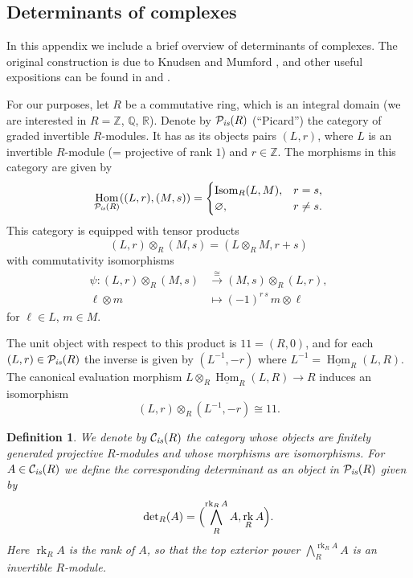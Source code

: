 \documentclass[10pt,a4paper,oneside,draft]{article}
\DeclareMathOperator{\Hom}{Hom}
\DeclareMathOperator{\Isom}{Isom}
\DeclareMathOperator{\rk}{rk}
\newcommand{\QQ}{\mathbb{Q}}
\newcommand{\RR}{\mathbb{R}}
\newcommand{\ZZ}{\mathbb{Z}}
\newcommand{\bone}{1\!\!1}
\renewcommand{\det}{\operatorname{det}}
\renewcommand{\emptyset}{\varnothing}
\newcommand{\is}{\text{\it is}}
\newcommand{\iHom}{\underline{\Hom}}
\theoremstyle{myplain}
\theoremstyle{mydefinition}
\newtheorem{definition}[theorem]{Definition}
\numberwithin{equation}{section}
\begin{document}
\begin{appendices}
\section{Determinants of complexes}
\label{app:determinants}

In this appendix we include a brief overview of determinants of complexes.
The original construction is due to Knudsen and Mumford
\cite{Knudsen-Mumford-1976}, and other useful expositions can be found in
\cite[Appendix~A]{Gelfand-Kapranov-Zelevinsky-1994} and
\cite[\S 2.1]{Kato-1993}.

For our purposes, let $R$ be a commutative ring, which is an integral domain
(we are interested in $R = \ZZ$, $\QQ$, $\RR$). Denote by
$\mathcal{P}_\is (R)$ (``Picard'') the category of graded invertible
$R$-modules. It has as its objects pairs $(L,r)$, where $L$ is an invertible
$R$-module (= projective of rank $1$) and $r \in \ZZ$. The morphisms in this
category are given by
\[ \Hom_{\mathcal{P}_\is (R)} ((L,r), (M,s)) = \begin{cases}
    \Isom_R (L,M), & r = s, \\
    \emptyset, & r \ne s.
  \end{cases} \]
This category is equipped with tensor products
$$(L,r) \otimes_R (M,s) = (L\otimes_R M, r + s)$$
with commutativity isomorphisms
\begin{align*}
  \psi\colon (L,r) \otimes_R (M,s) & \xrightarrow{\cong}
                                     (M,s) \otimes_R (L,r), \\
  \ell \otimes m & \mapsto (-1)^{r\,s}\,m\otimes \ell
\end{align*}
for $\ell \in L$, $m \in M$.

The unit object with respect to this product is $\bone = (R,0)$, and for each
$(L,r) \in \mathcal{P}_\is (R)$ the inverse is given by $(L^{-1}, -r)$ where
$L^{-1} = \iHom_R (L,R)$. The canonical evaluation morphism
$L \otimes_R \iHom_R (L,R) \to R$ induces an isomorphism
$$(L,r) \otimes_R (L^{-1}, -r) \cong \bone.$$

\begin{definition}
  \label{dfn:determinant-of-projective-fg-module}
  We denote by $\mathcal{C}_\is (R)$ the category whose objects are finitely
  generated projective $R$-modules and whose morphisms are isomorphisms.  For
  $A \in \mathcal{C}_\is (R)$ we define the corresponding determinant as an
  object in $\mathcal{P}_\is (R)$ given by
  $$\det_R (A) = \Bigl(\bigwedge^{\rk_R A}_R A, \rk_R A\Bigr).$$
  Here $\rk_R A$ is the rank of $A$, so that the top exterior power
  $\bigwedge^{\rk_R A}_R A$ is an invertible $R$-module.
\end{definition}


\end{appendices}
\end{document}
